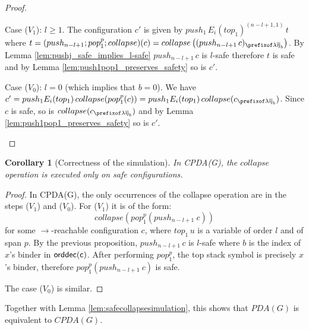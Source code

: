 \documentclass[a4paper]{article}
\newtheorem{corollary}[theorem]{Corollary}
\theoremstyle{remark}
\theoremstyle{definition}
\newcommand\orddec{\sf orddec}
\begin{document}
\begin{proof}
\begin{itemize}
Case ($V_1$): $l\geq 1$.
The configuration $c'$ is given by $push_1\, E_i(top_1)^{(n-l+1,1)}\, t$ where
$t = (push_{n-l+1};pop_1^p;collapse)(c) = collapse \left( (push_{n-l+1}\,c)_{\prefixof \lambda
\overline{\eta}_{b}} \right)$.
By Lemma \ref{lem:pushj_safe_implies_l-safe} $push_{n-l+1}\, c$ is $l$-safe therefore
$t$ is safe and by Lemma \ref{lem:push1pop1_preserves_safety} so is $c'$.

Case ($V_0$): $l=0$ (which implies that  $b=0$). We have $c' = push_1 E_i(top_1)\,collapse(pop_1^p(c)) =
push_1 E_i(top_1)\,collapse(c_{\prefixof \lambda \overline\eta_b})$.
Since $c$ is safe, so is $collapse(c_{\prefixof \lambda \overline\eta_b})$ and
by Lemma \ref{lem:push1pop1_preserves_safety} so is $c'$.
\qedhere
\end{itemize}
\end{proof}

\begin{corollary}[Correctness of the simulation] \hfill
In CPDA(G), the $collapse$ operation is executed only on safe configurations.
\end{corollary}
\begin{proof}
In CPDA(G), the only occurrences of the collapse operation are in the steps ($V_1$) and ($V_0$). For ($V_1$) it is of the form:
$$ collapse(pop_1^p(push_{n-l+1}~c))$$
for some $\rightarrow$-reachable configuration $c$, where $top_1\,u$ is a variable of order $l$ and of span $p$. By the previous proposition,
$push_{n-l+1}\,c$ is $l$-safe where $b$ is the index of $x$'s binder in $\orddec(c)$. After performing $pop_1^p$, the top stack symbol is precisely $x$'s binder, therefore $pop^p_1(push_{n-l+1}~c)$ is safe.

The case ($V_0$) is similar.
\end{proof}

Together with Lemma \ref{lem:safecollapsesimulation}, this shows that $PDA(G)$ is equivalent to $CPDA(G)$.
\end{document}
